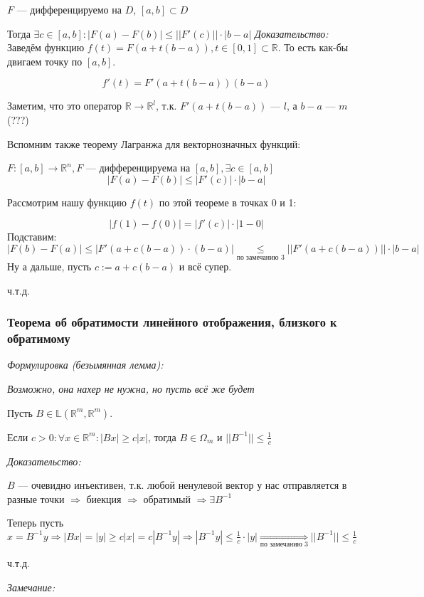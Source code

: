 \documentclass{article}
\begin{document}
$F$ --- дифференцируемо на $D$, $[a, b] \subset D$

Тогда $\exists c \in [a, b]: |F(a) - F(b)| \le ||F'(c)|| \cdot |b - a|$
\textit{Доказательство:}
Заведём функцию $f(t) = F(a + t(b - a)), t \in [0, 1] \subset \mathbb{R}$. То есть как-бы двигаем точку по $[a, b]$.

\[f'(t) = F'(a + t(b - a))(b - a)\]

Заметим, что это оператор $\mathbb{R} \rightarrow \mathbb{R}^l$, т.к. $F'(a + t(b - a))$ --- $l$, а $b - a$ --- $m$ (???)

Вспомним также теорему Лагранжа для векторнозначных функций:

$F: [a, b] \rightarrow \mathbb{R}^n, F$ --- дифференцируема на $[a, b], \exists c \in [a, b]$
\[|F(a) - F(b)| \le |F'(c)| \cdot |b - a|\]

Рассмотрим нашу функцию $f(t)$ по этой теореме в точках 0 и 1:

\[|f(1) - f(0)| = |f'(c)| \cdot |1 - 0|\]
Подставим:
\[|F(b) - F(a)| \le |F'(a + c(b - a))\cdot(b - a)| \underset{\text{по замечанию 3}}{\le} ||F'(a + c(b - a))|| \cdot |b - a|\]
Ну а дальше, пусть $c := a + c(b - a)$ и всё супер.

ч.т.д.



\subsubsection{Теорема об обратимости линейного отображения, близкого к обратимому}
\textit{Формулировка (безымянная лемма):}

\textit{Возможно, она нахер не нужна, но пусть всё же будет}

Пусть $B \in \mathbb{L}(\mathbb{R}^m, \mathbb{R}^m)$.

Если $c > 0: \forall x \in \mathbb{R}^m: |Bx| \ge c|x|$, тогда $B \in \Omega_m$ и $||B^{-1}|| \le \frac{1}{c}$

\textit{Доказательство:}

$B$ --- очевидно инъективен, т.к. любой ненулевой вектор у нас отправляется в разные точки $\Rightarrow$ биекция $\Rightarrow$ обратимый $\Rightarrow \exists B^{-1}$

Теперь пусть $x = B^{-1}y \Rightarrow |Bx| = |y| \ge c|x| = c |B^{-1}y| \Rightarrow |B^{-1}y| \le \frac{1}{c} \cdot |y| \underset{\text{по замечанию 3}}{\Rightarrow} ||B^{-1}|| \le \frac{1}{c}$

ч.т.д.

\textit{Замечание:}
\end{document}
